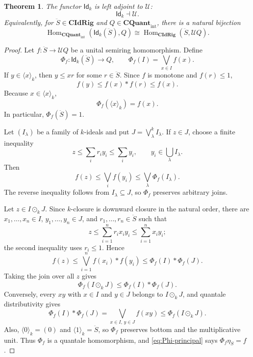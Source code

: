 \documentclass[10pt,a4paper]{amsart}
\newtheorem{theorem}{Theorem}
\newcommand{\CIdRig}{\mathbf{CIdRig}}
\newcommand{\Idk}{\mathsf{Id}_{k}}
\newcommand{\QuantTop}{\mathbf{CQuant}_{\mathrm{int}}}
\def\leq{\leqslant}
\begin{document}
\begin{theorem}\label{thm:k-ideal-quantale-adjunction}
The functor \(\Idk\) is left adjoint to \(\mathcal U\):
\[
\Idk\dashv\mathcal U.
\]
Equivalently, for \(\ddot S\in\CIdRig\) and \(Q\in\QuantTop\), there is a natural bijection
\[
\operatorname{Hom}_{\QuantTop}(\Idk(\ddot S),Q)
\cong
\operatorname{Hom}_{\CIdRig}(\ddot S,\mathcal UQ).
\]
\end{theorem}

\begin{proof}
Let \(f\colon\ddot S\to\mathcal UQ\) be a unital semiring homomorphism. Define
\[
\Phi_f\colon\Idk(\ddot S)\longrightarrow Q,
\qquad
\Phi_f(I)=\bigvee_{x\in I}f(x).
\]
If \(y\in\langle x\rangle_k\), then \(y\leq xr\) for some \(r\in\ddot S\). Since $f$ is monotone and \(f(r)\leq1\),
\[
f(y)\leq f(x)*f(r)\leq f(x).
\]
Because \(x\in\langle x\rangle_k\),
\begin{equation}\label{eq:Phi-principal}
\Phi_f(\langle x\rangle_k)=f(x).
\end{equation}
In particular, \(\Phi_f(\ddot S)=1\).

Let \((I_\lambda)\) be a family of $k$-ideals and put
\(J=\bigvee^k_\lambda I_\lambda\). If \(z\in J\), choose a finite inequality
\[
z\leq\sum_i r_i y_i\leq\sum_i y_i,
\qquad
y_i\in\bigcup_\lambda I_\lambda.
\]
Then
\[
f(z)\leq\bigvee_i f(y_i)
 \leq\bigvee_\lambda\Phi_f(I_\lambda).
\]
The reverse inequality follows from \(I_\lambda\subseteq J\), so \(\Phi_f\) preserves arbitrary joins.

Let \(z\in I\odot_kJ\). Since $k$-closure is downward closure in the natural order, there are \(x_1,\ldots,x_n\in I\), \(y_1,\ldots,y_n\in J\), and \(r_1,\ldots,r_n\in\ddot S\) such that
\[
z\leq\sum_{i=1}^n r_i x_i y_i
 \leq\sum_{i=1}^n x_i y_i;
\]
the second inequality uses \(r_i\leq1\). Hence
\[
f(z)\leq\bigvee_{i=1}^n f(x_i)*f(y_i)
 \leq\Phi_f(I)*\Phi_f(J).
\]
Taking the join over all $z$ gives
\[
\Phi_f(I\odot_kJ)\leq\Phi_f(I)*\Phi_f(J).
\]
Conversely, every \(xy\) with \(x\in I\) and \(y\in J\) belongs to \(I\odot_kJ\), and quantale distributivity gives
\[
\Phi_f(I)*\Phi_f(J)
 =\bigvee_{x\in I,\,y\in J}f(xy)
 \leq\Phi_f(I\odot_kJ).
\]
Also, \(\langle0\rangle_k=(0)\) and \(\langle1\rangle_k=\ddot S\), so \(\Phi_f\) preserves bottom and the multiplicative unit. Thus \(\Phi_f\) is a quantale homomorphism, and \eqref{eq:Phi-principal} says
\(\Phi_f\eta_{\ddot S}=f\).


\end{proof}
\end{document}
